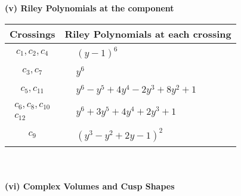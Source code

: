 \documentclass[1p]{elsarticle_modified}
\theoremstyle{definition}
\begin{document}
\newpage\renewcommand{\arraystretch}{1}
\flushleft \textbf{(v) Riley Polynomials at the component}\newline \\
\begin{tabular}{m{50pt}|m{274pt}}
Crossings & \hspace{64pt}Riley Polynomials at each crossing \\
\hline $$\begin{aligned}c_{1},c_{2},c_{4}\end{aligned}$$&$\begin{aligned}
&(y-1)^6
\end{aligned}$\\
\hline $$\begin{aligned}c_{3},c_{7}\end{aligned}$$&$\begin{aligned}
&y^6
\end{aligned}$\\
\hline $$\begin{aligned}c_{5},c_{11}\end{aligned}$$&$\begin{aligned}
&y^6- y^5+4 y^4-2 y^3+8 y^2+1
\end{aligned}$\\
\hline $$\begin{aligned}c_{6},c_{8},c_{10}\\c_{12}\end{aligned}$$&$\begin{aligned}
&y^6+3 y^5+4 y^4+2 y^3+1
\end{aligned}$\\
\hline $$\begin{aligned}c_{9}\end{aligned}$$&$\begin{aligned}
&(y^3- y^2+2 y-1)^2
\end{aligned}$\\
\hline
\end{tabular}\\~\\
\newpage\flushleft \textbf{(vi) Complex Volumes and Cusp Shapes}
\end{document}
